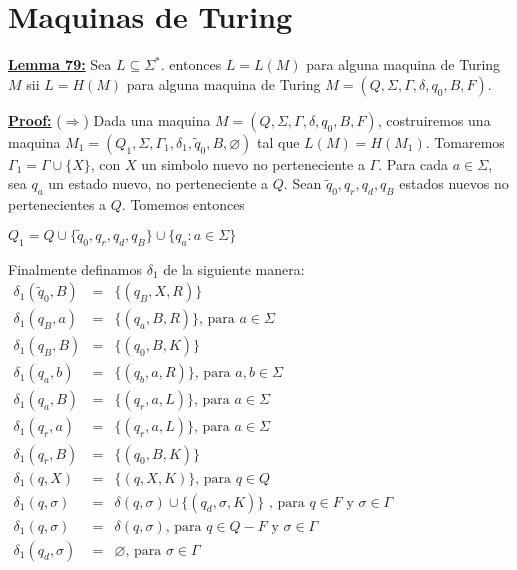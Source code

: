 \section{Maquinas de Turing}


\textbf{\underline{Lemma 79:}} Sea \(L\subseteq \Sigma ^{\ast }.\) entonces \(L=L(M)\) para alguna maquina de Turing \(M\) sii \(L=H(M)\) para alguna maquina de Turing \(M=(Q,\Sigma ,\Gamma ,\delta ,q_{0},B,F)\).

\textbf{\underline{Proof:}} (\(\Rightarrow \)) Dada una maquina \(M=(Q,\Sigma ,\Gamma ,\delta ,q_{0},B,F)\), costruiremos una maquina \(M_{1}=(Q_{1},\Sigma ,\Gamma _{1},\delta _{1}, \tilde{q}_{0},B,\varnothing )\) tal que \(L(M)=H(M_{1}).\) Tomaremos \(\Gamma _{1}=\Gamma \cup \{X\}\), con \(X\) un simbolo nuevo no perteneciente a \(\Gamma \). Para cada \(a\in \Sigma \), sea \(q_{a}\) un estado nuevo, no perteneciente a \(Q.\) Sean \(\tilde{q}_{0},q_{r},q_{d},q_{B}\) estados nuevos no pertenecientes a \(Q.\) Tomemos entonces

\(\displaystyle Q_{1}=Q\cup \{\tilde{q}_{0},q_{r},q_{d},q_{B}\}\cup \{q_{a}:a\in \Sigma \} \)

Finalmente definamos \(\delta _{1}\) de la siguiente manera:
\(\displaystyle \begin{array}{rcl} \delta _{1}(\tilde{q}_{0},B) & =& \{(q_{B},X,R)\} \\ \delta _{1}(q_{B},a) & =& \{(q_{a},B,R)\}\text{, para }a\in \Sigma \\ \delta _{1}(q_{B},B) & =& \{(q_{0},B,K)\} \\ \delta _{1}(q_{a},b) & =& \{(q_{b},a,R)\}\text{, para }a,b\in \Sigma \\ \delta _{1}(q_{a},B) & =& \{(q_{r},a,L)\}\text{, para }a\in \Sigma \\ \delta _{1}(q_{r},a) & =& \{(q_{r},a,L)\}\text{, para }a\in \Sigma \\ \delta _{1}(q_{r},B) & =& \{(q_{0},B,K)\} \\ \delta _{1}(q,X) & =& \{(q,X,K)\}\text{, para }q\in Q \\ \delta _{1}(q,\sigma ) & =& \delta (q,\sigma )\cup \{(q_{d},\sigma ,K)\}\text{ , para }q\in F\text{ y }\sigma \in \Gamma \\ \delta _{1}(q,\sigma ) & =& \delta (q,\sigma )\text{, para }q\in Q-F\text{ y } \sigma \in \Gamma \\ \delta _{1}(q_{d},\sigma ) & =& \varnothing \text{, para }\sigma \in \Gamma \end{array} \)

